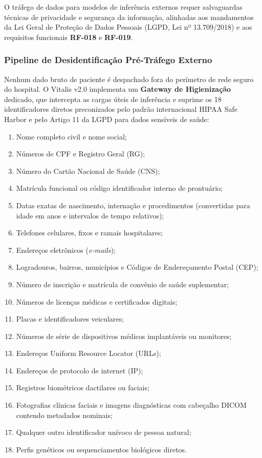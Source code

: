 O tráfego de dados para modelos de inferência externos requer salvaguardas técnicas de privacidade e segurança da informação, alinhadas aos mandamentos da Lei Geral de Proteção de Dados Pessoais (LGPD, Lei nº 13.709/2018) \cite{brasil_lgpd:2018} e aos requisitos funcionais \textbf{RF-018} e \textbf{RF-019}.

\subsubsection{Pipeline de Desidentificação Pré-Tráfego Externo}
Nenhum dado bruto de paciente é despachado fora do perímetro de rede seguro do hospital. O Vitalis v2.0 implementa um \textbf{Gateway de Higienização} dedicado, que intercepta as cargas úteis de inferência e suprime os 18 identificadores diretos preconizados pelo padrão internacional HIPAA Safe Harbor e pelo Artigo 11 da LGPD para dados sensíveis de saúde:
\begin{enumerate}[noitemsep]
    \item Nome completo civil e nome social;
    \item Números de CPF e Registro Geral (RG);
    \item Número do Cartão Nacional de Saúde (CNS);
    \item Matrícula funcional ou código identificador interno de prontuário;
    \item Datas exatas de nascimento, internação e procedimentos (convertidas para idade em anos e intervalos de tempo relativos);
    \item Telefones celulares, fixos e ramais hospitalares;
    \item Endereços eletrônicos (\textit{e-mails});
    \item Logradouros, bairros, municípios e Códigos de Endereçamento Postal (CEP);
    \item Número de inscrição e matrícula de convênio de saúde suplementar;
    \item Números de licenças médicas e certificados digitais;
    \item Placas e identificadores veiculares;
    \item Números de série de dispositivos médicos implantáveis ou monitores;
    \item Endereços Uniform Resource Locator (URLs);
    \item Endereços de protocolo de internet (IP);
    \item Registros biométricos dactilares ou faciais;
    \item Fotografias clínicas faciais e imagens diagnósticas com cabeçalho DICOM contendo metadados nominais;
    \item Qualquer outro identificador unívoco de pessoa natural;
    \item Perfis genéticos ou sequenciamentos biológicos diretos.
\end{enumerate}

